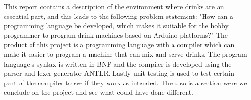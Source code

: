This report contains a description of the environment where drinks are an essential part, and this leads to the following problem statement:
"How can a programming language be developed, which makes it suitable for the hobby programmer to program drink machines based on Arduino platforms?"
The product of this project is a programming language with a compiler which can make it easier to program a machine that can mix and serve drinks. The program language's syntax is written in BNF and the compiler is developed using the parser and lexer generator ANTLR. Lastly unit testing is used to test certain part of the compiler to see if they work as intended. The also is a section were we conclude on the project and see what could have done different.